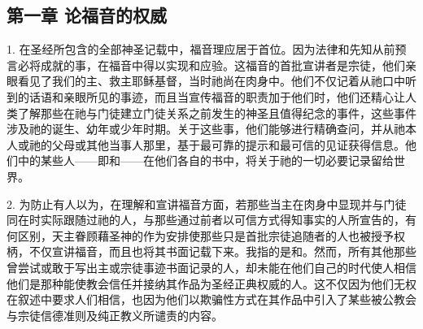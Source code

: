 \par


\subsection{第一章 论福音的权威}

1. 在圣经所包含的全部神圣记载中，福音理应居于首位。因为法律和先知从前预言必将成就的事，在福音中得以实现和应验。这福音的首批宣讲者是宗徒，他们亲眼看见了我们的主、救主耶稣基督，当时祂尚在肉身中。他们不仅记着从祂口中听到的话语和亲眼所见的事迹，而且当宣传福音的职责加于他们时，他们还精心让人类了解那些在祂与门徒建立门徒关系之前发生的神圣且值得纪念的事件，这些事件涉及祂的诞生、幼年或少年时期。关于这些事，他们能够进行精确查问，并从祂本人或祂的父母或其他当事人那里，基于最可靠的提示和最可信的见证获得信息。他们中的某些人——即和——在他们各自的书中，将关于祂的一切必要记录留给世界。\par

2. 为防止有人以为，在理解和宣讲福音方面，若那些当主在肉身中显现并与门徒同在时实际跟随过祂的人，与那些通过前者以可信方式得知事实的人所宣告的，有何区别，天主眷顾藉圣神的作为安排使那些只是首批宗徒追随者的人也被授予权柄，不仅宣讲福音，而且也将其书面记载下来。我指的是和。然而，所有其他那些曾尝试或敢于写出主或宗徒事迹书面记录的人，却未能在他们自己的时代使人相信他们是那种能使教会信任并接纳其作品为圣经正典权威的人。这不仅因为他们无权在叙述中要求人们相信，也因为他们以欺骗性方式在其作品中引入了某些被公教会与宗徒信德准则及纯正教义所谴责的内容。\par


